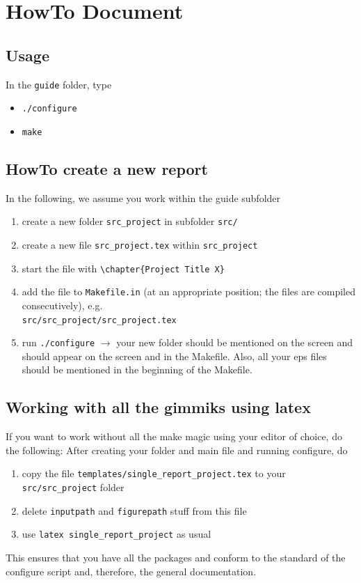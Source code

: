 \chapter{HowTo Document \ccarat{}} 

\newcommand{\test}[1]{\vec{#1}}

\section{Usage}

In the \verb|guide| folder, type
\begin{itemize}
\item \verb|./configure|
\item \verb|make|
\end{itemize}


\section{HowTo create a new report}
In the following, we assume you work within the guide subfolder
\begin{enumerate}
  \item create a new folder \verb|src_project| in subfolder \verb|src/|
  \item create a new file \verb|src_project.tex| within \verb|src_project|
  \item start the file with \verb|\chapter{Project Title X}|
  \item add the file to \texttt{Makefile.in} (at an appropriate position; the files are compiled consecutively), e.g.\\
  \verb|src/src_project/src_project.tex|
  \item run \verb|./configure| $\to$ your new folder should be mentioned on the screen and should appear on the screen and in the Makefile. Also, all your eps files should be mentioned in the beginning of the Makefile.
\end{enumerate}


\section{Working with all the gimmiks using latex}
If you want to work without all the make magic using your editor of choice, do the following:
After creating your folder and main file and running configure, do
\begin{enumerate}
 \item copy the file \verb|templates/single_report_project.tex| to your \verb|src/src_project| folder
 \item delete \verb|inputpath| and \verb|figurepath| stuff from this file
 \item use \verb|latex single_report_project| as usual
\end{enumerate}
This ensures that you have all the packages and conform to the standard of the configure script and, therefore, the general \ccarat{} documentation.


